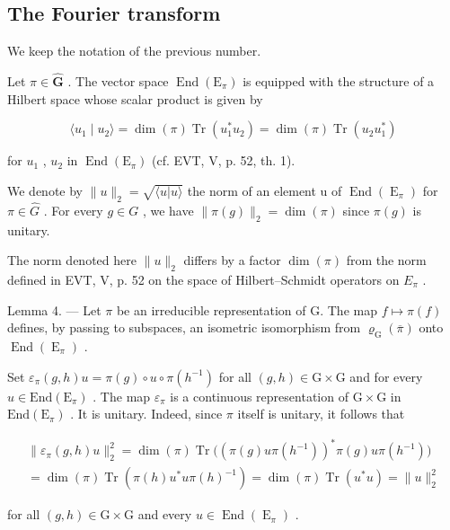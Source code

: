 \subsection{The Fourier transform}

We keep the notation of the previous number.

Let \(\pi \in \widehat{\mathbf{G}}\) . The vector space \(\operatorname{End}(\mathrm{E}_{\pi})\) is equipped with the structure of a Hilbert space whose scalar product is given by

\[
\langle u _ {1} \mid u _ {2} \rangle = \dim (\pi) \operatorname{Tr} (u _ {1} ^ {*} u _ {2}) = \dim (\pi) \operatorname{Tr} (u _ {2} u _ {1} ^ {*})
\]

for \(u_{1}\) , \(u_{2}\) in \(\operatorname{End}(\mathrm{E}_{\pi})\) (cf. EVT, V, p. 52, th. 1).

We denote by \(\|u\|_{2} = \sqrt{\langle u|u\rangle}\) the norm of an element u of \(\operatorname{End}(\operatorname{E}_{\pi})\) for \(\pi \in \widehat{G}\) . For every \(g \in G\) , we have \(\|\pi(g)\|_{2} = \dim(\pi)\) since \(\pi(g)\) is unitary.

The norm denoted here \(\|u\|_{2}\) differs by a factor \(\dim(\pi)\) from the norm defined in EVT, V, p. 52 on the space of Hilbert–Schmidt operators on \(E_{\pi}\) .

Lemma 4. --- Let \(\pi\) be an irreducible representation of G. The map \(f \mapsto \pi(f)\) defines, by passing to subspaces, an isometric isomorphism from \(\varrho_{\mathrm{G}}(\overline{\pi})\) onto \(\operatorname{End}(\operatorname{E}_{\pi})\) .

Set \(\varepsilon_{\pi}(g,h)u = \pi(g)\circ u\circ\pi(h^{-1})\) for all \((g,h)\in\mathrm{G}\times\mathrm{G}\) and for every \(u\in\mathrm{End}(\mathrm{E}_{\pi})\) . The map \(\varepsilon_{\pi}\) is a continuous representation of \(\mathrm{G}\times\mathrm{G}\) in \(\mathrm{End}(\mathrm{E}_{\pi})\) . It is unitary. Indeed, since \(\pi\) itself is unitary, it follows that

\[
\begin{array}{c} \| \varepsilon_ {\pi} (g, h) u \| _ {2} ^ {2} = \dim (\pi) \operatorname{Tr} \Big ((\pi (g) u \pi (h ^ {- 1})) ^ {*} \pi (g) u \pi (h ^ {- 1}) \Big) \\ = \dim (\pi) \operatorname{Tr} (\pi (h) u ^ {*} u \pi (h) ^ {- 1}) = \dim (\pi) \operatorname{Tr} (u ^ {*} u) = \| u \| _ {2} ^ {2} \end{array}
\]

for all \((g,h)\in \mathrm{G}\times \mathrm{G}\) and every \(u\in \operatorname {End}(\operatorname {E}_{\pi})\) .

